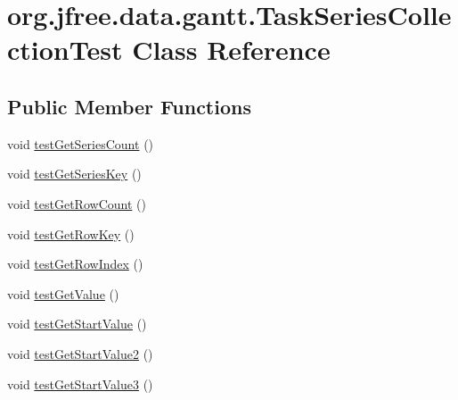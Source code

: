 \hypertarget{classorg_1_1jfree_1_1data_1_1gantt_1_1_task_series_collection_test}{}\section{org.\+jfree.\+data.\+gantt.\+Task\+Series\+Collection\+Test Class Reference}
\label{classorg_1_1jfree_1_1data_1_1gantt_1_1_task_series_collection_test}
\subsection*{Public Member Functions}
\begin{DoxyCompactItemize}
\item 
void \mbox{\hyperlink{classorg_1_1jfree_1_1data_1_1gantt_1_1_task_series_collection_test_a05fe044ae4bd21bfc535a8f77059697c}{test\+Get\+Series\+Count}} ()
\item 
void \mbox{\hyperlink{classorg_1_1jfree_1_1data_1_1gantt_1_1_task_series_collection_test_a136a097cb10a9307e8da3c8a1043220f}{test\+Get\+Series\+Key}} ()
\item 
void \mbox{\hyperlink{classorg_1_1jfree_1_1data_1_1gantt_1_1_task_series_collection_test_a15303b1e9805037511826c3844e1638a}{test\+Get\+Row\+Count}} ()
\item 
void \mbox{\hyperlink{classorg_1_1jfree_1_1data_1_1gantt_1_1_task_series_collection_test_a50465f704470367685ed3e6a9bf4c784}{test\+Get\+Row\+Key}} ()
\item 
void \mbox{\hyperlink{classorg_1_1jfree_1_1data_1_1gantt_1_1_task_series_collection_test_a76dca781ea4adb7cb4366c0f4ec70ac4}{test\+Get\+Row\+Index}} ()
\item 
void \mbox{\hyperlink{classorg_1_1jfree_1_1data_1_1gantt_1_1_task_series_collection_test_a8018566a65d5f40a28c2c198329aeb47}{test\+Get\+Value}} ()
\item 
void \mbox{\hyperlink{classorg_1_1jfree_1_1data_1_1gantt_1_1_task_series_collection_test_a3aa701487eafe47028ffc1cd8760cba0}{test\+Get\+Start\+Value}} ()
\item 
void \mbox{\hyperlink{classorg_1_1jfree_1_1data_1_1gantt_1_1_task_series_collection_test_ac11d77f39a44fe9c3f520eb6af8bef8b}{test\+Get\+Start\+Value2}} ()
\item 
void \mbox{\hyperlink{classorg_1_1jfree_1_1data_1_1gantt_1_1_task_series_collection_test_a03e5b991d60d7de8e258a54311d0418a}{test\+Get\+Start\+Value3}} ()
\item 

\end{DoxyCompactItemize}
